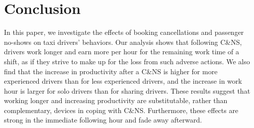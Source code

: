 \documentclass[reviewmode]{restud}
\begin{document}





\section{Conclusion}

In this paper, we investigate the effects of booking cancellations and passenger no-shows on taxi drivers' behaviors. Our analysis shows that following C\&NS, drivers work longer and earn more per hour for the remaining work time of a shift, as if they strive to make up for the loss from such adverse actions. We also find that the increase in productivity after a C\&NS is higher for more experienced drivers than for less experienced drivers, and the increase in work hour is larger for solo drivers than for sharing drivers. These results suggest that working longer and increasing productivity are substitutable, rather than complementary, devices in coping with C\&NS. Furthermore, these effects are strong in the immediate following hour and fade away afterward.
\end{document}
